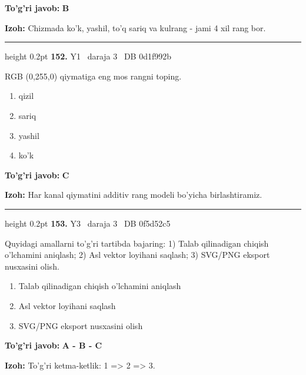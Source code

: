 \documentclass[10pt,a4paper,oneside]{article}
\begin{document}
\begin{tcolorbox}[enhanced,breakable,colback=teal!4,colframe=teal!45!black,boxrule=0.45pt,arc=1.2mm,left=2.8mm,right=2.8mm,top=2mm,bottom=2mm,before skip=2mm,after skip=2mm]
\textbf{\color{teal}To'g'ri javob:} \textbf{B}
\par\smallskip
\textbf{Izoh:} Chizmada ko'k, yashil, to'q sariq va kulrang - jami 4 xil rang bor.
\end{tcolorbox}
\vspace{2mm}\hrule height 0.2pt \vspace{4mm}
\hypertarget{q152}{\textbf{\color{ink}152.}}  {\color{muted}\scriptsize Y1 \textbullet\ daraja 3 \textbullet\ DB 0d1f992b}
\par
RGB (0,255,0) qiymatiga eng mos rangni toping.
\begin{enumerate}[label=\Alph*),leftmargin=9mm]
\item qizil
\item sariq
\item yashil
\item ko'k
\end{enumerate}
\begin{tcolorbox}[enhanced,breakable,colback=teal!4,colframe=teal!45!black,boxrule=0.45pt,arc=1.2mm,left=2.8mm,right=2.8mm,top=2mm,bottom=2mm,before skip=2mm,after skip=2mm]
\textbf{\color{teal}To'g'ri javob:} \textbf{C}
\par\smallskip
\textbf{Izoh:} Har kanal qiymatini additiv rang modeli bo'yicha birlashtiramiz.
\end{tcolorbox}
\vspace{2mm}\hrule height 0.2pt \vspace{4mm}
\hypertarget{q153}{\textbf{\color{ink}153.}}  {\color{muted}\scriptsize Y3 \textbullet\ daraja 3 \textbullet\ DB 0f5d52c5}
\par
Quyidagi amallarni to'g'ri tartibda bajaring: 1) Talab qilinadigan chiqish o'lchamini aniqlash; 2) Asl vektor loyihani saqlash; 3) SVG/PNG eksport nusxasini olish.
\begin{enumerate}[label=\Alph*),leftmargin=9mm]
\item Talab qilinadigan chiqish o'lchamini aniqlash
\item Asl vektor loyihani saqlash
\item SVG/PNG eksport nusxasini olish
\end{enumerate}
\begin{tcolorbox}[enhanced,breakable,colback=teal!4,colframe=teal!45!black,boxrule=0.45pt,arc=1.2mm,left=2.8mm,right=2.8mm,top=2mm,bottom=2mm,before skip=2mm,after skip=2mm]
\textbf{\color{teal}To'g'ri javob:} \textbf{A - B - C}
\par\smallskip
\textbf{Izoh:} To'g'ri ketma-ketlik: 1 =\textgreater{} 2 =\textgreater{} 3.
\end{tcolorbox}
\end{document}

